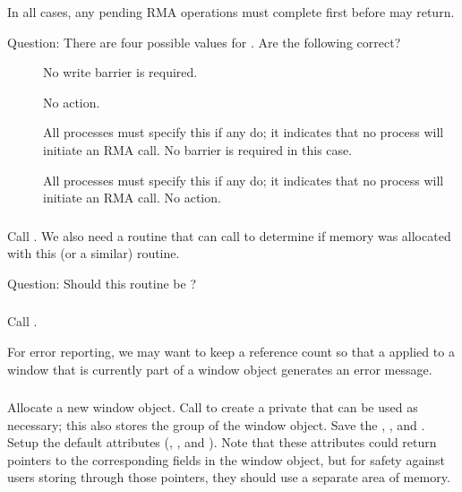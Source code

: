 \documentclass{article}
\begin{document}
In all cases, any pending RMA operations must complete first before
 may return.

Question:  There are four possible  values for
.  Are the following correct?
\begin{description}
\item[]No write barrier is required.
\item[]No action.
\item[]All processes must specify this if any do;
  it 
  indicates that no process will initiate an RMA call.  No barrier is required
  in this case.
\item[]All processes must specify this if any do;
  it indicates that no process will initiate an RMA call.  No action.
\end{description}

\subsubsection{}
Call .  We also need a routine that
 can call to determine if memory was allocated with
this (or a similar) routine.

Question: Should this routine be ?

\subsubsection{}
Call .

For error reporting, we may want to keep a reference count so that a
 applied to a window that is currently part of a window
object generates an error message.

\subsubsection{}
Allocate a new window object.  Call  to create a
private  that can be used as necessary; this also stores
the group of the window object.  Save the ,
, and . 
Setup the default attributes (,
, and ).  Note that these
attributes could return pointers to the corresponding fields in the window
object, but for safety against users storing through those pointers, they
should use a separate area of memory.
\end{document}
